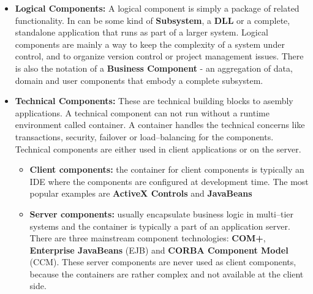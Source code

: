 \begin{itemize}
\item {\bf Logical Components:}
A logical component is simply a package of related functionality.
In can be some kind of {\bf Subsystem}, a {\bf DLL} or a complete, 
standalone application that runs as part of a larger system.
Logical components are mainly a way to keep the complexity of a system under 
control, and to organize version control or project management issues.
There is also the notation of a {\bf Business Component} \cite{HerzumSims99} - 
an aggregation of data, domain and user components that embody a complete
subsystem.

\item {\bf Technical Components:}
These are technical building blocks to asembly applications.
A technical component can not run without a runtime environment called 
container. A container handles the technical concerns like transactions,
security, failover or load--balancing for the components.
Technical components are either used in client applications or on the server.
\begin{itemize}
  \item {\bf Client components:}
  the container for client components is typically an IDE where the 
  components are configured at development time.
  The most popular examples are {\bf ActiveX Controls} and {\bf JavaBeans}

  \item {\bf Server components:}
  usually encapsulate business logic in multi--tier 
  systems and the container is typically a part of an application server.
  There are three mainstream component technologies: {\bf COM+}, 
  {\bf Enterprise JavaBeans} (EJB) and {\bf CORBA Component Model} (CCM).
  These server components are never used as client components, because
  the containers are rather complex and not available at the client side.
\end{itemize}
\end{itemize}


